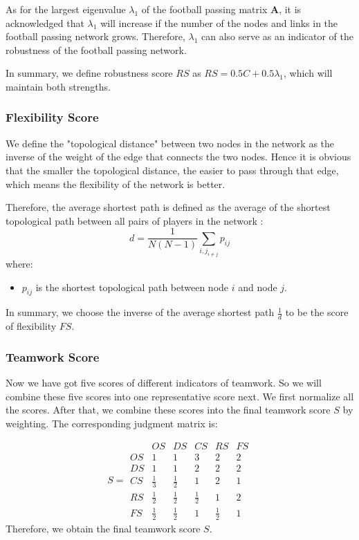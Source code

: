 \documentclass{mcmthesis}
\begin{document}
	As for the largest eigenvalue $\lambda_{1}$ of the football passing matrix $\textbf{A}$, it is acknowledged that $\lambda_{1}$ will increase if the number of the nodes and links in the football passing network grows.  Therefore, $\lambda_{1}$ can also serve as an indicator of the robustness of the football passing network.

	In summary, we define robustness score $RS$ as $RS = 0.5C + 0.5\lambda_{1}$, which will maintain both strengths.
\subsubsection{Flexibility Score}
	We define the "topological distance" between two nodes in the network as the inverse of the weight of the edge that connects the two nodes. Hence it is obvious that the smaller the topological distance, the easier to pass through that edge, which means the flexibility of the network is better. 
	
	Therefore, the average shortest path is defined as the average of the shortest topological path between all pairs of players in the network :
	\begin{equation}\label{eq:d}
		d = \frac{1}{N(N-1)} \sum_{i,j_{i \ne j}}p_{ij}
	\end{equation}
	where:
	\begin{itemize}
		\item 	$p_{ij}$ is the shortest topological path between node $i$ and node $j$.
	\end{itemize}

	In summary, we choose the inverse of the average shortest path $\frac{1}{d}$ to be the score of flexibility $FS$.
\subsubsection{Teamwork Score}
	Now we have got five scores of different indicators of teamwork. So we will combine these five scores into one representative score next.  We first normalize all the scores. After that, we combine these scores into the final teamwork score $S$ by weighting. The corresponding judgment matrix is:

	\begin{equation}\label{mat:n}
		S=
 	\begin{matrix}
   		 & OS & DS & CS & RS & FS \\
   		OS & 1 & 1 & 3 & 2 & 2 \\
		DS & 1 & 1 & 2 & 2 & 2\\
		CS & \frac{1}{3} & \frac{1}{2} & 1 & 2 & 1\\ 
		RS & \frac{1}{2} & \frac{1}{2} & \frac{1}{2} & 1 & 2\\ 
		FS & \frac{1}{2} & \frac{1}{2} & 1 & \frac{1}{2} & 1
		
  	\end{matrix} 
	\end{equation}
	Therefore, we obtain the final teamwork score $S$.
\end{document}
